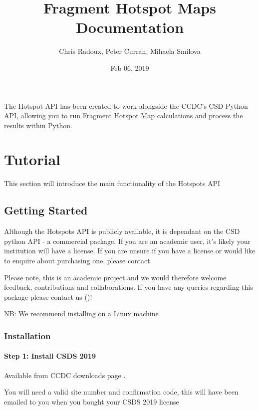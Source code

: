 \documentclass[letterpaper,10pt,english]{sphinxmanual}
\title{Fragment Hotspot Maps Documentation}
\date{Feb 06, 2019}
\author{Chris Radoux, Peter Curran, Mihaela Smilova}
\begin{document}
\pagestyle{empty}
\sphinxmaketitle
\pagestyle{plain}
\sphinxtableofcontents
\pagestyle{normal}
\label{\detokenize{index::doc}}


The Hotspot API has been created to work alongside the CCDC’s CSD Python API, allowing you to run Fragment Hotspot Map
calculations and process the results within Python.


\chapter{Tutorial}
\label{\detokenize{tutorial:tutorial}}\label{\detokenize{tutorial::doc}}
This section will introduce the main functionality of the Hotspots API


\section{Getting Started}
\label{\detokenize{tutorial:getting-started}}
Although the Hotspots API is publicly available, it is dependant on the CSD python API - a commercial package.
If you are an academic user, it’s likely your institution will have a license. If you are unsure if you have a
license or would like to enquire about purchasing one, please contact 

Please note, this is an academic project and we would therefore welcome feedback, contributions and collaborations.
If you have any queries regarding this package please contact us ()!

NB: We recommend installing on a Linux machine


\subsection{Installation}
\label{\detokenize{tutorial:installation}}

\subsubsection{Step 1: Install CSDS 2019}
\label{\detokenize{tutorial:step-1-install-csds-2019}}
Available from CCDC downloads page .

You will need a valid site number and confirmation code, this will have been emailed to you when you bought your CSDS 2019 license
\end{document}
